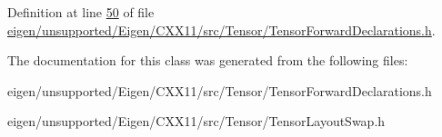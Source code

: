 Definition at line \hyperlink{eigen_2unsupported_2_eigen_2_c_x_x11_2src_2_tensor_2_tensor_forward_declarations_8h_source_l00050}{50} of file \hyperlink{eigen_2unsupported_2_eigen_2_c_x_x11_2src_2_tensor_2_tensor_forward_declarations_8h_source}{eigen/unsupported/\+Eigen/\+C\+X\+X11/src/\+Tensor/\+Tensor\+Forward\+Declarations.\+h}.



The documentation for this class was generated from the following files\+:\begin{DoxyCompactItemize}
\item 
eigen/unsupported/\+Eigen/\+C\+X\+X11/src/\+Tensor/\+Tensor\+Forward\+Declarations.\+h\item 
eigen/unsupported/\+Eigen/\+C\+X\+X11/src/\+Tensor/\+Tensor\+Layout\+Swap.\+h\end{DoxyCompactItemize}
